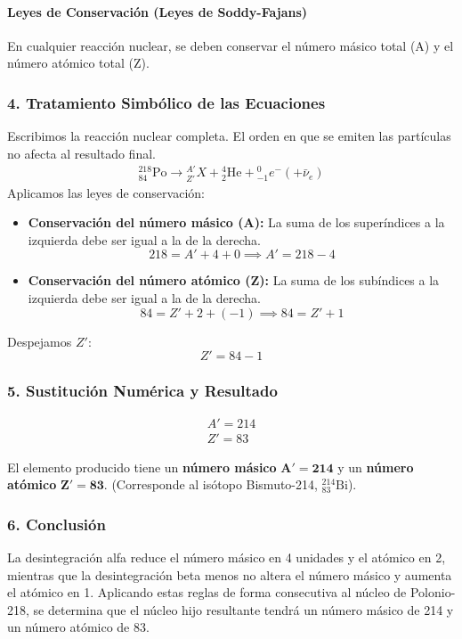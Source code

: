 \paragraph{Leyes de Conservación (Leyes de Soddy-Fajans)}
En cualquier reacción nuclear, se deben conservar el número másico total (A) y el número atómico total (Z).

\subsubsection*{4. Tratamiento Simbólico de las Ecuaciones}
Escribimos la reacción nuclear completa. El orden en que se emiten las partículas no afecta al resultado final.
\begin{gather}
    {}_{84}^{218}\text{Po} \to {}_{Z'}^{A'}X + {}_{2}^{4}\text{He} + {}_{-1}^{0}e^{-} (+ \bar{\nu}_e)
\end{gather}
Aplicamos las leyes de conservación:
\begin{itemize}
    \item \textbf{Conservación del número másico (A):} La suma de los superíndices a la izquierda debe ser igual a la de la derecha.
    $$ 218 = A' + 4 + 0 \implies A' = 218 - 4 $$
    \item \textbf{Conservación del número atómico (Z):} La suma de los subíndices a la izquierda debe ser igual a la de la derecha.
    $$ 84 = Z' + 2 + (-1) \implies 84 = Z' + 1 $$
\end{itemize}
Despejamos $Z'$: $$ Z' = 84 - 1 $$

\subsubsection*{5. Sustitución Numérica y Resultado}
\begin{gather}
    A' = 214 \\
    Z' = 83
\end{gather}
\begin{cajaresultado}
El elemento producido tiene un \textbf{número másico} $\boldsymbol{A'=214}$ y un \textbf{número atómico} $\boldsymbol{Z'=83}$. (Corresponde al isótopo Bismuto-214, ${}_{83}^{214}\text{Bi}$).
\end{cajaresultado}

\subsubsection*{6. Conclusión}
\begin{cajaconclusion}
La desintegración alfa reduce el número másico en 4 unidades y el atómico en 2, mientras que la desintegración beta menos no altera el número másico y aumenta el atómico en 1. Aplicando estas reglas de forma consecutiva al núcleo de Polonio-218, se determina que el núcleo hijo resultante tendrá un número másico de 214 y un número atómico de 83.
\end{cajaconclusion}

\newpage